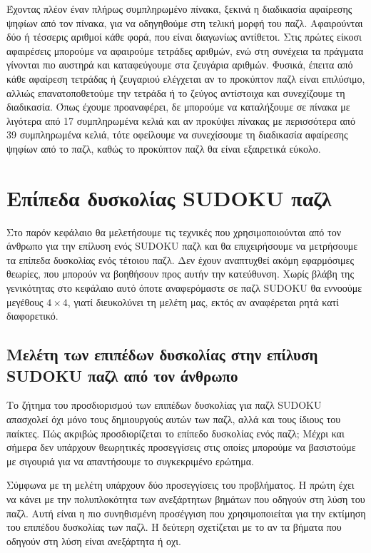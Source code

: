\documentclass[12pt]{book}
\theoremstyle{definition}
\begin{document}
Έχοντας πλέον έναν πλήρως συμπληρωμένο πίνακα, ξεκινά η διαδικασία αφαίρεσης ψηφίων από τον πίνακα, για να οδηγηθούμε στη τελική μορφή του παζλ. Αφαιρούνται δύο ή τέσσερις αριθμοί κάθε φορά, που είναι διαγωνίως αντίθετοι. Στις πρώτες είκοσι αφαιρέσεις μπορούμε να αφαιρούμε τετράδες αριθμών, ενώ στη συνέχεια τα πράγματα γίνονται πιο αυστηρά και καταφεύγουμε στα ζευγάρια αριθμών. Φυσικά, έπειτα από κάθε αφαίρεση τετράδας ή ζευγαριού ελέγχεται αν το προκύπτον παζλ είναι επιλύσιμο, αλλιώς επανατοποθετούμε την τετράδα ή το ζεύγος αντίστοιχα και συνεχίζουμε τη διαδικασία. Όπως έχουμε προαναφέρει, δε μπορούμε να καταλήξουμε σε πίνακα με λιγότερα από 17 συμπληρωμένα κελιά και αν προκύψει πίνακας με περισσότερα από 39 συμπληρωμένα κελιά, τότε οφείλουμε να συνεχίσουμε τη διαδικασία αφαίρεσης ψηφίων από το παζλ, καθώς το προκύπτον παζλ θα είναι εξαιρετικά εύκολο. \par

\chapter{Επίπεδα δυσκολίας SUDOKU παζλ}

Στο παρόν κεφάλαιο θα μελετήσουμε τις τεχνικές που χρησιμοποιούνται από τον άνθρωπο για την επίλυση ενός SUDOKU παζλ και θα επιχειρήσουμε να μετρήσουμε τα επίπεδα δυσκολίας ενός τέτοιου παζλ. Δεν έχουν αναπτυχθεί ακόμη εφαρμόσιμες θεωρίες, που μπορούν να βοηθήσουν προς αυτήν την κατεύθυνση. Χωρίς βλάβη της γενικότητας στο κεφάλαιο αυτό όποτε αναφερόμαστε σε παζλ SUDOKU θα εννοούμε μεγέθους \(4 \times 4\), γιατί διευκολύνει τη μελέτη μας, εκτός αν αναφέρεται ρητά κατί διαφορετικό. \par

\section{Μελέτη των επιπέδων δυσκολίας στην επίλυση SUDOKU παζλ από τον άνθρωπο}

Το ζήτημα του προσδιορισμού των επιπέδων δυσκολίας για παζλ SUDOKU απασχολεί όχι μόνο τους δημιουργούς αυτών των παζλ, αλλά και τους ίδιους του παίκτες. Πώς ακριβώς προσδιορίζεται το επίπεδο δυσκολίας ενός παζλ; Μέχρι και σήμερα δεν υπάρχουν θεωρητικές προσεγγίσεις στις οποίες μπορούμε να βασιστούμε με σιγουριά για να απαντήσουμε το συγκεκριμένο ερώτημα. \par

Σύμφωνα με τη μελέτη \cite{5} υπάρχουν δύο προσεγγίσεις του προβλήματος. Η πρώτη έχει να κάνει με την πολυπλοκότητα των ανεξάρτητων βημάτων που οδηγούν στη λύση του παζλ. Αυτή είναι η πιο συνηθισμένη προσέγγιση που χρησιμοποιείται για την εκτίμηση του επιπέδου δυσκολίας των παζλ. Η δεύτερη σχετίζεται με το αν τα βήματα που οδηγούν στη λύση είναι ανεξάρτητα ή οχι. \par
\end{document}

